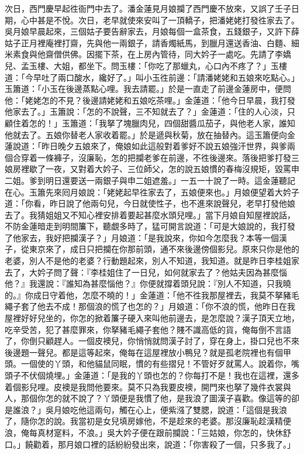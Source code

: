 次日，西門慶早起徃衙門中去了。潘金蓮見月娘攔了西門慶不放來，又誤了壬子日期，{}心中甚是不悅。{}次日，老早就使來安叫了一頂轎子，把潘姥姥打發徃家去了。{}吳月娘早晨起來，三個姑子要告辭家去，月娘每個一盒茶食，五錢銀子，又許下薛姑子正月裡庵裡打齋，先與他一兩銀子，請香燭紙馬，到臘月還送香油、白麵、細米素食與他齋僧供佛。因擺下茶，在上房內管待，同大妗子一處吃。先請了李嬌兒、孟玉樓、大姐，都坐下。問玉樓：「你吃了那蠟丸，心口內不疼了？」玉樓道：「今早吐了兩口酸水，纔好了。」叫小玉徃前邊：「請潘姥姥和五娘來吃點心。」玉簫道：「小玉在後邊蒸點心哩。我去請罷。」{}於是一直走了前邊金蓮房中，便問他：「姥姥怎的不見？後邊請姥姥和五娘吃茶哩。」金蓮道：「他今日早晨，我打發他家去了。」玉簫說：「怎的不說聲，三不知就去了？」金蓮道：「住的人心淡，只顧住着怎的！」玉簫道：「我拏了塊臘肉兒，四個甜醬瓜茄子，與他老人家，誰知他就去了。五娘你替老人家收着罷。」於是遞與秋菊，放在抽替內。這玉簫便向金蓮說道：「昨日晚夕五娘來了，俺娘如此這般對着爹好不說五娘強汗世界，與爹兩個合穿着一條褲子，沒廉恥，怎的把攔老爹在前邊，不徃後邊來。落後把爹打發三娘房裡歇了一夜，又對着大妗子、三位師父，怎的說五娘慣的春梅沒規矩，毀罵申二姐。爹到明日還要送一兩銀子與申二姐遮羞。」一五一十說了一時。這金蓮聽記在心。玉簫先來囘月娘說：「姥姥起早徃家去了，五娘便來也。」月娘便望着大妗子道：「你看，昨日說了他兩句兒，今日就使性子，也不進來說聲兒，老早打發他娘去了。我猜姐姐又不知心裡安排着要起甚麼水頭兒哩。」{}當下月娘自知屋裡說話，不防金蓮暗走到明間簾下，聽覷多時了，猛可開言說道：「可是大娘說的，我打發了他家去，我好把攔漢子？」月娘道：「是我說來，你如今怎麼我？本等一個漢子，從東京來了，成日只把攔在你那前頭，通不來後邊傍個影兒。原來只你是他的老婆，別人不是他的老婆？行動題起來，別人不知道，我知道。就是昨日李桂姐家去了，大妗子問了聲：『李桂姐住了一日兒，如何就家去了？他姑夫因為甚麼惱他？』我還說：『誰知為甚麼惱他？』你便就撐着頭兒說：『別人不知道，只我曉的。』{}你成日守着他，怎麼不曉的！」金蓮道：「他不徃我那屋裡去，我莫不拏豬毛繩子套了他去不成！那個浪的慌了也怎的？」{}月娘道：「你不浪的慌，他昨日在我屋裡好好兒坐的，你怎的掀着簾子硬入來叫他前邊去，是怎麼說？漢子頂天立地，吃辛受苦，犯了甚麼罪來，你拏豬毛繩子套他？{}賤不識高低的貨，俺每倒不言語了，你倒只顧趕人。一個皮襖兒，你悄悄就問漢子討了，穿在身上，掛口兒也不來後邊題一聲兒。{}都是這等起來，俺每在這屋裡放小鴨兒？就是孤老院裡也有個甲頭。一個使的丫頭，和他貓鼠同眠，慣的有些摺兒！不管好歹就罵人。說着你，嘴頭子不伏個燒埋。」金蓮道：「是我的丫頭也怎的？你每打不是！我也在這裡，還多着個影兒哩。皮襖是我問他要來。莫不只為我要皮襖，開門來也拏了幾件衣裳與人，那個你怎的就不說了？{}丫頭便是我慣了他，是我浪了圖漢子喜歡。像這等的卻是誰浪？」吳月娘吃他這兩句，觸在心上，便紫漒了雙腮，說道：「這個是我浪了，隨你怎的說。我當初是女兒填房嫁他，不是趁來的老婆。那沒廉恥趁漢精便浪，俺每真材寔料，不浪。」{}吳大妗子便在跟前攔說：「三姑娘，你怎的，快休舒口。」饒勸着，那月娘口裡的話紛紛發出來，說道：「你害殺了一個，只多我了。」